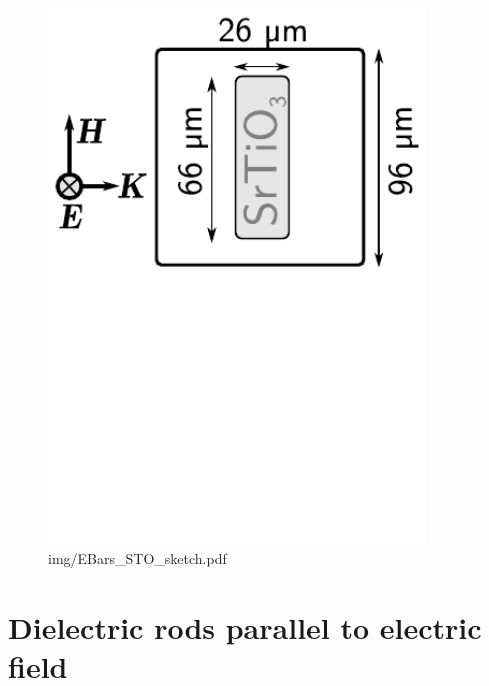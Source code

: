 \begin{figure} \caption{img/EBars\_STO\_sketch.pdf}  \centering \includegraphics[width=10cm]{img/EBars_STO_sketch.pdf} \end{figure} \clearpage
\section{Dielectric rods parallel to electric field} %








